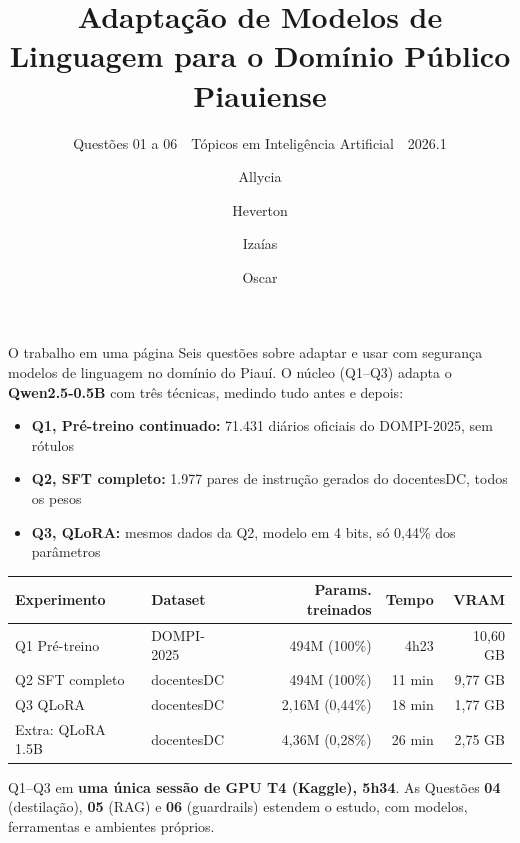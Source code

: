 \documentclass[10pt,aspectratio=169]{beamer}
\title{Adaptação de Modelos de Linguagem para o Domínio Público Piauiense}
\subtitle{Questões 01 a 06 \,\textbullet\, Tópicos em Inteligência Artificial \,\textbullet\, 2026.1}
\author{Allycia \and Heverton \and Izaías \and Oscar}
\institute{Departamento de Computação, UFPI \\ Professor: Raimundo Santos Moura}
\date{}
\newcommand{\antes}[1]{{\color{LaranjaAntes}#1}}
\newcommand{\depois}[1]{{\color{VerdeDepois}#1}}
\begin{document}
\maketitle

\begin{frame}{O trabalho em uma página}
  Seis questões sobre adaptar e usar com segurança modelos de linguagem no domínio do Piauí. O núcleo (Q1--Q3) adapta o \textbf{Qwen2.5-0.5B} com três técnicas, medindo tudo \antes{antes} e \depois{depois}:
  \begin{itemize}
    \item \textbf{Q1, Pré-treino continuado:} 71.431 diários oficiais do DOMPI-2025, sem rótulos
    \item \textbf{Q2, SFT completo:} 1.977 pares de instrução gerados do docentesDC, todos os pesos
    \item \textbf{Q3, QLoRA:} mesmos dados da Q2, modelo em 4 bits, só 0,44\% dos parâmetros
  \end{itemize}
  \vfill
  \begin{center}
    \small
    \begin{tabular}{@{}l l r r r@{}}
      \toprule
      \textbf{Experimento} & \textbf{Dataset} & \textbf{Params. treinados} & \textbf{Tempo} & \textbf{VRAM} \\
      \midrule
      Q1 Pré-treino  & DOMPI-2025 & 494M (100\%)   & 4h23   & 10,60 GB \\
      Q2 SFT completo & docentesDC & 494M (100\%)   & 11 min & 9,77 GB \\
      Q3 QLoRA        & docentesDC & 2,16M (0,44\%) & 18 min & 1,77 GB \\
      Extra: QLoRA 1.5B & docentesDC & 4,36M (0,28\%) & 26 min & 2,75 GB \\
      \bottomrule
    \end{tabular}
  \end{center}
  \vfill
  Q1--Q3 em \textbf{uma única sessão de GPU T4 (Kaggle), 5h34}. As Questões \textbf{04} (destilação), \textbf{05} (RAG) e \textbf{06} (guardrails) estendem o estudo, com modelos, ferramentas e ambientes próprios.
\end{frame}
\end{document}

